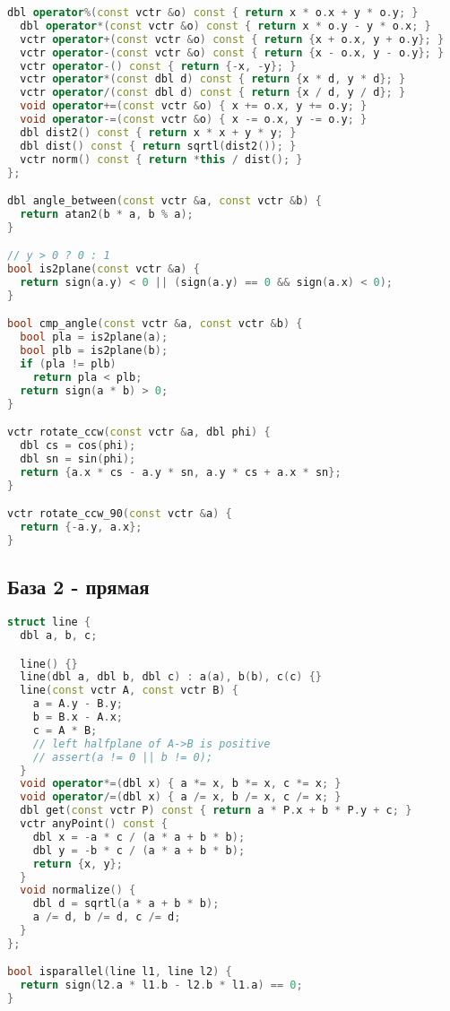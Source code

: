 \documentclass[9pt,a4paper,landscape,twosided]{extarticle}
\begin{document}
\begin{multicols*}{3}
\begin{lstlisting}[language=C++]
  dbl operator%(const vctr &o) const { return x * o.x + y * o.y; }
  dbl operator*(const vctr &o) const { return x * o.y - y * o.x; }
  vctr operator+(const vctr &o) const { return {x + o.x, y + o.y}; }
  vctr operator-(const vctr &o) const { return {x - o.x, y - o.y}; }
  vctr operator-() const { return {-x, -y}; }
  vctr operator*(const dbl d) const { return {x * d, y * d}; }
  vctr operator/(const dbl d) const { return {x / d, y / d}; }
  void operator+=(const vctr &o) { x += o.x, y += o.y; }
  void operator-=(const vctr &o) { x -= o.x, y -= o.y; }
  dbl dist2() const { return x * x + y * y; }
  dbl dist() const { return sqrtl(dist2()); }
  vctr norm() const { return *this / dist(); }
};

dbl angle_between(const vctr &a, const vctr &b) {
  return atan2(b * a, b % a);
}

// y > 0 ? 0 : 1
bool is2plane(const vctr &a) {
  return sign(a.y) < 0 || (sign(a.y) == 0 && sign(a.x) < 0);
}

bool cmp_angle(const vctr &a, const vctr &b) {
  bool pla = is2plane(a);
  bool plb = is2plane(b);
  if (pla != plb)
    return pla < plb;
  return sign(a * b) > 0;
}

vctr rotate_ccw(const vctr &a, dbl phi) {
  dbl cs = cos(phi);
  dbl sn = sin(phi);
  return {a.x * cs - a.y * sn, a.y * cs + a.x * sn};
}

vctr rotate_ccw_90(const vctr &a) {
  return {-a.y, a.x};
}

\end{lstlisting}

\subsection{База 2 - прямая}
\begin{lstlisting}[language=C++]
struct line {
  dbl a, b, c;

  line() {}
  line(dbl a, dbl b, dbl c) : a(a), b(b), c(c) {}
  line(const vctr A, const vctr B) {
    a = A.y - B.y;
    b = B.x - A.x;
    c = A * B;
    // left halfplane of A->B is positive
    // assert(a != 0 || b != 0);
  }
  void operator*=(dbl x) { a *= x, b *= x, c *= x; }
  void operator/=(dbl x) { a /= x, b /= x, c /= x; }
  dbl get(const vctr P) const { return a * P.x + b * P.y + c; }
  vctr anyPoint() const {
    dbl x = -a * c / (a * a + b * b);
    dbl y = -b * c / (a * a + b * b);
    return {x, y};
  }
  void normalize() {
    dbl d = sqrtl(a * a + b * b);
    a /= d, b /= d, c /= d;
  }
};

bool isparallel(line l1, line l2) {
  return sign(l2.a * l1.b - l2.b * l1.a) == 0;
}


\end{lstlisting}
\end{multicols*}
\end{document}

